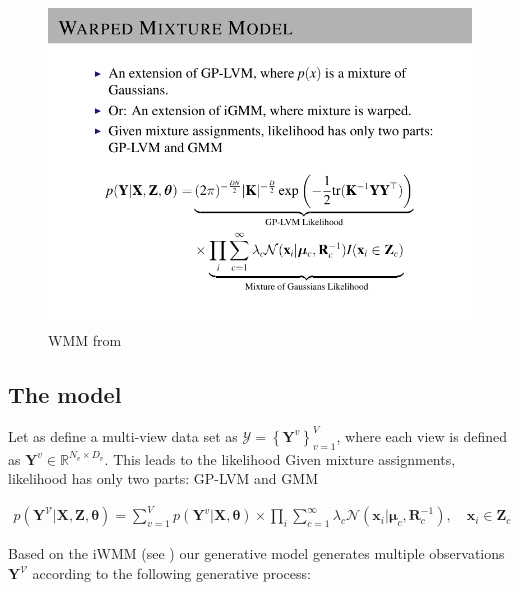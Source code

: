 \documentclass[]{article}
\newcommand{\gD}[2]{\mathcal{N}\left(#1,#2\right)}
\begin{document}
\begin{figure}[h!]
	\centering
	\includegraphics[width=.9\linewidth]{img/iwmm_talk_Model}
	\caption{WMM from \cite{IwaDuvGha2012warped}}
\end{figure}

\subsection{The model}

Let as define a multi-view data set as $\mathcal{Y}=\left\{\mathbf{Y}^{v}\right\}_{v=1}^{V}$, where each view is defined as $\mathbf{Y}^{v}\in \mathbb{R}^{N_v\times D_v}$. This leads to the likelihood Given mixture assignments, likelihood has only two parts:
GP-LVM and GMM

\begin{align}
p\left(\mathbf{Y}^{\mathcal{V}}|\mathbf{X},\mathbf{Z},\boldsymbol{\theta}\right) = \sum_{v=1}^{V}p(\mathbf{Y}^v|\mathbf{X},\boldsymbol{\theta})\times \prod_{i}\sum_{c=1}^{\infty} \lambda_c\gD{\mathbf{x}_i|\boldsymbol{\mu}_c}{\mathbf{R}_c^{-1}} ,\quad \mathbf{x}_i \in \mathbf{Z}_c
\end{align}


Based on the iWMM (see \cite{IwaDuvGha2012warped}) our generative model generates multiple observations $\mathbf{Y}^{\mathcal{V}}$ according to the following generative process:
\end{document}
